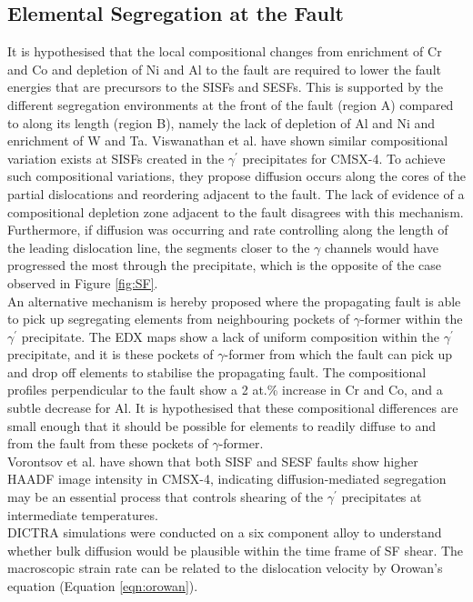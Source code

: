 \documentclass[a4paper,12pt,times,numbered,print,index]{Classes/PhDThesisPSnPDF}
\begin{document}
\subsection*{Elemental Segregation at the Fault}
It is hypothesised that the local compositional changes from enrichment of Cr and Co and depletion of Ni and Al to the fault are required to lower the fault energies that are precursors to the SISFs and SESFs.\cite{} This is supported by the different segregation environments at the front of the fault (region A) compared to along its length (region B), namely the lack of depletion of Al and Ni and enrichment of W and Ta. Viswanathan et al. have shown similar compositional variation exists at SISFs created in the $\gamma^{\prime}$ precipitates for CMSX-4.\cite{} To achieve such compositional variations, they propose diffusion occurs along the cores of the partial dislocations and reordering adjacent to the fault. The lack of evidence of a compositional depletion zone adjacent to the fault disagrees with this mechanism. Furthermore, if diffusion was occurring and rate controlling along the length of the leading dislocation line, the segments closer to the $\gamma$ channels would have progressed the most through the precipitate, which is the opposite of the case observed in Figure \ref{fig:SF}.\\
An alternative mechanism is hereby proposed where the propagating fault is able to pick up segregating elements from neighbouring pockets of $\gamma$-former within the $\gamma^{\prime}$ precipitate. The EDX maps show a lack of uniform composition within the $\gamma^{\prime}$ precipitate, and it is these pockets of $\gamma$-former from which the fault can pick up and drop off elements to stabilise the propagating fault. The compositional profiles perpendicular to the fault show a 2 at.\% increase in Cr and Co, and a subtle decrease for Al. It is hypothesised that these compositional differences are small enough that it should be possible for elements to readily diffuse to and from the fault from these pockets of $\gamma$-former.\\
Vorontsov et al. have shown that both SISF and SESF faults show higher HAADF image intensity in CMSX-4, indicating diffusion-mediated segregation may be an essential process that controls shearing of the $\gamma^{\prime}$ precipitates at intermediate temperatures.\cite{}\\
DICTRA simulations were conducted on a six component alloy to understand whether bulk diffusion would be plausible within the time frame of SF shear. The macroscopic strain rate can be related to the dislocation velocity by Orowan's equation (Equation \ref{eqn:orowan}).
\end{document}
